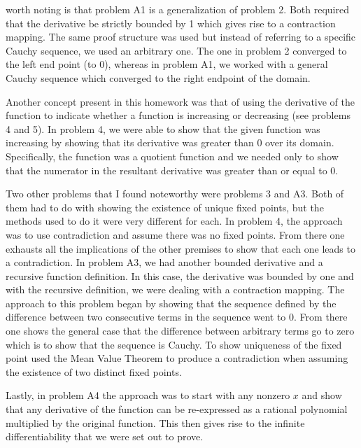 \documentclass[12pt]{article}
\theoremstyle{definition}
\begin{document}
    worth noting is that problem A1 is a generalization of problem 2. Both
    required that the derivative be strictly bounded by 1 which gives rise to
    a contraction mapping. The same
    proof structure was used but instead of referring to a specific Cauchy
    sequence, we used an arbitrary one. The one in problem 2 converged to the left
    end point (to 0), whereas in problem A1, we worked with a general Cauchy
    sequence which converged to the right endpoint of the domain. 
    \par\hfill\par Another
    concept present in this homework was that of using the derivative of the
    function to indicate whether a function is increasing or decreasing (see
    problems 4 and 5). In problem 4, we were able to show that the given
    function was increasing by showing that its derivative was greater than
    0 over its domain. Specifically, the function was a quotient function and
    we needed only to show that the numerator in the resultant derivative was
    greater than or equal to 0.\par\hfill\par Two other problems that I found
    noteworthy were problems 3 and A3. Both of them had to do with showing the
    existence of unique fixed points, but the methods used to do it were very
    different for each. In problem 4, the approach was to use contradiction and
    assume there was no fixed points. From there one exhausts all the
    implications of the other premises to show that each one leads to
    a contradiction. In problem A3, we had another bounded derivative and
    a recursive function definition. In this case, the derivative was bounded
    by one and with the recursive definition, we were dealing with
    a contraction mapping. The approach to this problem began by showing that
    the sequence defined by the difference between two consecutive terms in the
    sequence went to 0. From there one shows the general case that the
    difference between arbitrary terms go to zero which is to show that the
    sequence is Cauchy. To show uniqueness of the fixed point used the Mean
    Value Theorem to produce a contradiction when assuming the existence of two
    distinct fixed points.\par\hfill\par Lastly, in problem A4 the approach was
    to start with any nonzero $x$ and show that any derivative of the function
    can be re-expressed as a rational polynomial multiplied by the original
    function. This then gives rise to the
    infinite differentiability that we were set out to prove. 
\end{document}
